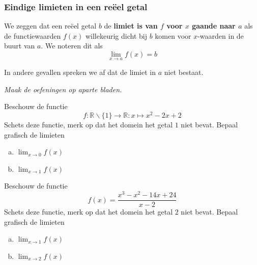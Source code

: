 \documentclass[12pt,twoside,a4paper]{article}
\newenvironment{definitie}
{
  \vspace{0.4cm}
  \begin{mdframed}[nobreak=true,frametitle={Definitie}]
  }{%
  \end{mdframed}
}
\begin{document}
\subsubsection*{Eindige limieten in een reëel getal}
\begin{definitie}
We zeggen dat een reëel getal $b$ de {\bf limiet is van $f$ voor $x$ gaande naar $a$} als de functiewaarden $f(x)$ willekeurig dicht bij $b$ komen voor $x$-waarden in de buurt van $a$. We noteren dit als
  $$\lim_{x\to a} f(x)=b$$
\end{definitie}

In andere gevallen spreken we af dat de limiet in $a$ niet bestaat.

{\em Maak de oefeningen op aparte bladen.}

\begin{oefening}
  Beschouw de functie
  $$f:\mathbb{R}\backslash\{1\} \to \mathbb{R}:x \mapsto x^2-2x+2$$
  Schets deze functie, merk op dat het domein het getal $1$ niet bevat. Bepaal grafisch de limieten
  \begin{enumerate}[(a)]
  \itemsep.5em
  \item $\displaystyle\lim_{x\to0} f(x)$
  \item $\displaystyle\lim_{x\to1} f(x)$
  \end{enumerate}
\end{oefening}

\begin{oefening}
  Beschouw de functie
  $$f(x)=\dfrac{x^3-x^2-14x+24}{x-2}$$
  Schets deze functie, merk op dat het domein het getal $2$ niet bevat. Bepaal grafisch de limieten
  \begin{enumerate}[(a)]
  \itemsep.5em
  \item $\displaystyle\lim_{x\to1} f(x)$
  \item $\displaystyle\lim_{x\to2} f(x)$
  \end{enumerate}
\end{oefening}
\end{document}
